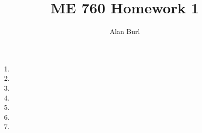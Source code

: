 \documentclass[12pt]{article}
\author{Alan Burl}
\title{ME 760 Homework 1}
\begin{document}
\maketitle
\clearpage
\begin{enumerate}
	\item \clearpage %
	\item \clearpage
	\item \clearpage %
	\item \clearpage %
	\item \clearpage %
	\item \clearpage
	\item \clearpage
\end{enumerate}
\clearpage
\end{document}
